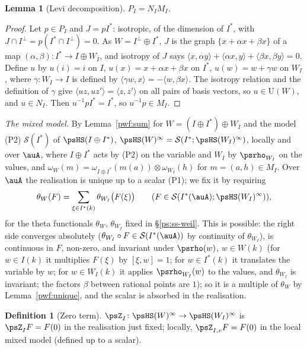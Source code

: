 \documentclass[10pt]{amsart}
\newtheorem{lemma}[theorem]{Lemma}
\theoremstyle{definition}
\newtheorem{definition}[theorem]{Definition}
\theoremstyle{remark}
\providecommand{\auS}{\mathcal S}
\providecommand{\auU}{\mathrm U}
\begin{document}
\begin{lemma}[Levi decomposition]\label{pwf:levi}
$P_I=N_IM_I$.
\end{lemma}
\begin{proof}
Let $p\in P_I$ and $J=pI^*$: isotropic, of the dimension of $I^*$, with $J\cap I^\perp=p(I^*\cap
I^\perp)=0$. As $W=I^\perp\oplus I^*$, $J$ is the graph $\{x+\alpha x+\beta x\}$ of a map $(\alpha,
\beta)\colon I^*\to I\oplus W_I$, and isotropy of $J$ says $\langle x,\alpha y\rangle+\langle\alpha x,
y\rangle+\langle\beta x,\beta y\rangle=0$. Define $u$ by $u(i)=i$ on $I$, $u(x)=x+\alpha x+\beta x$ on
$I^*$, $u(w)=w+\gamma w$ on $W_I$, where $\gamma\colon W_I\to I$ is defined by $\langle\gamma w,x\rangle
=-\langle w,\beta x\rangle$. The isotropy relation and the definition of $\gamma$ give $\langle uz,uz'
\rangle=\langle z,z'\rangle$ on all pairs of basis vectors, so $u\in\auU(W)$, and $u\in N_I$. Then
$u^{-1}pI^*=I^*$, so $u^{-1}p\in M_I$.
\end{proof}

\emph{The mixed model.} By Lemma~\ref{pwf:sum} for $W=(I\oplus I^*)\oplus W_I$ and the model (P2)
$\auS(I^*)$ of $\psHS(I\oplus I^*)$, $\psHS(W)^\infty=\auS(I^*;\psHS(W_I)^\infty)$, locally and over
$\auA$, where $I\oplus I^*$ acts by (P2) on the variable and $W_I$ by $\psrho_{W_I}$ on the values,
and $\omega_W(m)=\omega_{I\oplus I^*}(m(a))\otimes\omega_{W_I}(h)$ for $m=(a,h)\in M_I$. Over $\auA$
the realisation is unique up to a scalar (P1); we fix it by requiring
\begin{equation}\label{pwf:eq-thetamixed}
\theta_W(F)=\sum_{\xi\in I^*(k)}\theta_{W_I}\bigl(F(\xi)\bigr)\qquad(F\in\auS(I^*(\auA);\psHS(W_I)^\infty)),
\end{equation}
for the theta functionals $\theta_W$, $\theta_{W_I}$ fixed in \S\ref{ps:ss-weil}. This is possible:
the right side converges absolutely ($\theta_{W_I}\circ F\in\auS(I^*(\auA))$ by continuity of
$\theta_{W_I}$), is continuous in $F$, non-zero, and invariant under $\psrho(w)$, $w\in W(k)$ (for
$w\in I(k)$ it multiplies $F(\xi)$ by $[\xi,w]=1$; for $w\in I^*(k)$ it translates the variable by
$w$; for $w\in W_I(k)$ it applies $\psrho_{W_I}(w)$ to the values, and $\theta_{W_I}$ is invariant;
the factors $\beta$ between rational points are $1$); so it is a multiple of $\theta_W$ by
Lemma~\ref{pwf:unique}, and the scalar is absorbed in the realisation.

\begin{definition}[Zero term]\label{pwf:defZ}
$\psZ_I\colon\psHS(W)^\infty\to\psHS(W_I)^\infty$ is $\psZ_IF=F(0)$ in the realisation just fixed;
locally, $\psZ_{I,v}F=F(0)$ in the local mixed model (defined up to a scalar).
\end{definition}
\end{document}
